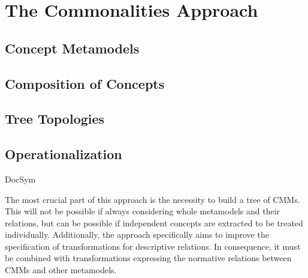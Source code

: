 \section{The Commonalities Approach}
\label{chap:improvement:commonalities}

\subsection{Concept Metamodels}

\subsection{Composition of Concepts}

\subsection{Tree Topologies}

\subsection{Operationalization}


\begin{copiedFrom}{DocSym} %

The most crucial part of this approach is the necessity to build a tree of \glspl{CMM}.
This will not be possible if always considering whole metamodels and their relations, but can be possible if independent concepts are extracted to be treated individually.
Additionally, the approach specifically aims to improve the specification of transformations for descriptive relations.
In consequence, it must be combined with transformations expressing the normative relations between \glspl{CMM} and other metamodels.

\end{copiedFrom} %


